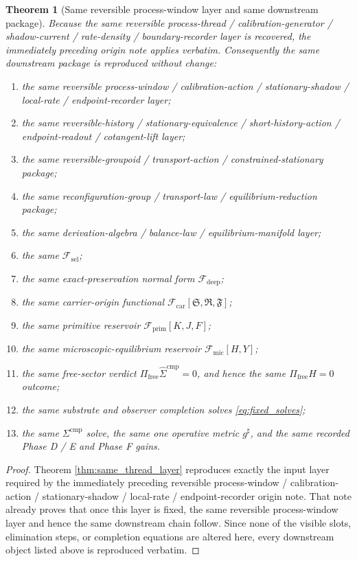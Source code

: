 \documentclass[11pt]{article}
\newcommand{\CompletedMetric}{g^{\sharp}}
\newcommand{\CompLift}{\widehat\Sigma^{\mathrm{cmp}}}
\newcommand{\FreeProj}{\Pi_{\mathrm{free}}}
\newcommand{\GaugeAux}{Y}
\newcommand{\MicFunctional}{\mathscr F_{\mathrm{mic}}}
\newcommand{\PrimFunctional}{\mathscr F_{\mathrm{prim}}}
\newcommand{\CarrierFunctional}{\mathscr F_{\mathrm{car}}}
\newcommand{\DeepFunctional}{\mathscr F_{\mathrm{deep}}}
\newcommand{\StemFunctional}{\mathscr F_{\mathrm{sel}}}
\newcommand{\PrimStrain}{K}
\newcommand{\PrimNeutral}{J}
\newcommand{\PrimFree}{F}
\newcommand{\CarrierSeed}{\mathfrak S}
\newcommand{\RelabelSeed}{\mathfrak R}
\newcommand{\FreeSeed}{\mathfrak F}
\newtheorem{theorem}{Theorem}
\begin{document}
\begin{theorem}[Same reversible process-window layer and same downstream package]
\label{thm:same_package}
Because the same reversible process-thread / calibration-generator / shadow-current / rate-density / boundary-recorder layer is recovered, the immediately preceding origin note applies verbatim. Consequently the same downstream package is reproduced without change:
\begin{enumerate}
    \item the same reversible process-window / calibration-action / stationary-shadow / local-rate / endpoint-recorder layer;
    \item the same reversible-history / stationary-equivalence / short-history-action / endpoint-readout / cotangent-lift layer;
    \item the same reversible-groupoid / transport-action / constrained-stationary package;
    \item the same reconfiguration-group / transport-law / equilibrium-reduction package;
    \item the same derivation-algebra / balance-law / equilibrium-manifold layer;
    \item the same \(\StemFunctional\);
    \item the same exact-preservation normal form \(\DeepFunctional\);
    \item the same carrier-origin functional \(\CarrierFunctional[\CarrierSeed,\RelabelSeed,\FreeSeed]\);
    \item the same primitive reservoir \(\PrimFunctional[\PrimStrain,\PrimNeutral,\PrimFree]\);
    \item the same microscopic-equilibrium reservoir \(\MicFunctional[H,\GaugeAux]\);
    \item the same free-sector verdict \(\FreeProj\CompLift=0\), and hence the same \(\Pi_{\mathrm{free}}H=0\) outcome;
    \item the same substrate and observer completion solves \eqref{eq:fixed_solves};
    \item the same \(\Sigma^{\mathrm{cmp}}\) solve, the same one operative metric \(\CompletedMetric\), and the same recorded Phase D / E and Phase F gains.
\end{enumerate}
\end{theorem}

\begin{proof}
Theorem \ref{thm:same_thread_layer} reproduces exactly the input layer required by the immediately preceding reversible process-window / calibration-action / stationary-shadow / local-rate / endpoint-recorder origin note. That note already proves that once this layer is fixed, the same reversible process-window layer and hence the same downstream chain follow. Since none of the visible slots, elimination steps, or completion equations are altered here, every downstream object listed above is reproduced verbatim.
\end{proof}
\end{document}
